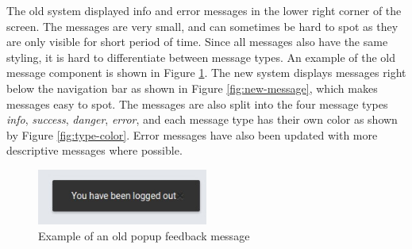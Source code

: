 The old system displayed info and error messages in the lower right corner of the screen. The messages are very small, and can sometimes be hard to spot as they are only visible for short period of time. Since all messages also have the same styling, it is hard to differentiate between message types. An example of the old message component is shown in Figure \ref{fig:old-message}. The new system displays messages right below the navigation bar as shown in Figure \ref{fig:new-message}, which makes messages easy to spot. The messages are also split into the four message types \textit{info}, \textit{success}, \textit{danger}, \textit{error}, and each message type has their own color as shown by Figure \ref{fig:type-color}. Error messages have also been updated with more descriptive messages where possible. \\

\begin{figure}[h!]
    \centering
    \includegraphics[width=0.5\textwidth]{figs/old_message.jpg}
    \caption[Example of an old popup feedback message]{Example of an old popup feedback message}
    \label{fig:old-message}
\end{figure}


